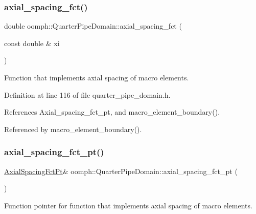 \subsubsection{\texorpdfstring{axial\+\_\+spacing\+\_\+fct()}{axial\_spacing\_fct()}}
{\footnotesize\ttfamily double oomph\+::\+Quarter\+Pipe\+Domain\+::axial\+\_\+spacing\+\_\+fct (\begin{DoxyParamCaption}\item[{const double \&}]{xi }\end{DoxyParamCaption})\hspace{0.3cm}{\ttfamily [inline]}}



Function that implements axial spacing of macro elements. 



Definition at line 116 of file quarter\+\_\+pipe\+\_\+domain.\+h.



References Axial\+\_\+spacing\+\_\+fct\+\_\+pt, and macro\+\_\+element\+\_\+boundary().



Referenced by macro\+\_\+element\+\_\+boundary().

\mbox{\label{classoomph_1_1QuarterPipeDomain_aa2731d4c5fb22dc0a5d2faa32f99505e}} 
\subsubsection{\texorpdfstring{axial\+\_\+spacing\+\_\+fct\+\_\+pt()}{axial\_spacing\_fct\_pt()}}
{\footnotesize\ttfamily \hyperlink{classoomph_1_1QuarterPipeDomain_a540d441b38146aacb12938d5f885789c}{Axial\+Spacing\+Fct\+Pt}\& oomph\+::\+Quarter\+Pipe\+Domain\+::axial\+\_\+spacing\+\_\+fct\+\_\+pt (\begin{DoxyParamCaption}{ }\end{DoxyParamCaption})\hspace{0.3cm}{\ttfamily [inline]}}



Function pointer for function that implements axial spacing of macro elements. 



